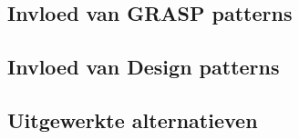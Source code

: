\label{patterns}
\subsection{Invloed van GRASP patterns}
\label{grasppatterns}
\subsection{Invloed van Design patterns}
\label{designpatterns}
\subsection{Uitgewerkte alternatieven}
